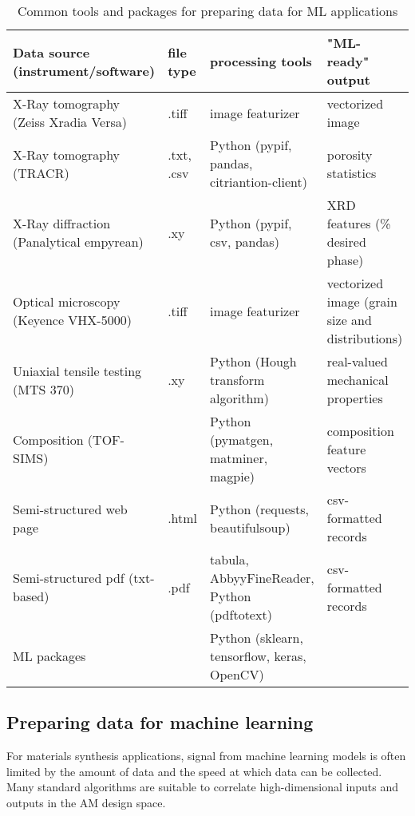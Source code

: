 \begin{table*}
    \renewcommand{\arraystretch}{0.8}
    \setlength{\tabcolsep}{5pt}
    \begin{center}
        \begin{tabular}{@{}llll@{}}
            \toprule
            Data source (instrument/software) & file type & processing tools & "ML-ready" output \\ \midrule
            \hline
            \hline
            X-Ray tomography (Zeiss Xradia Versa) & .tiff & image featurizer & vectorized image \\
            X-Ray tomography (TRACR) & .txt, .csv & Python (pypif, pandas, citriantion-client) & porosity statistics \\
            X-Ray diffraction (Panalytical empyrean) & .xy & Python (pypif, csv, pandas) & XRD features (\% desired phase) \\
            Optical microscopy (Keyence VHX-5000) & .tiff & image featurizer & vectorized image (grain size and distributions) \\
            Uniaxial tensile testing (MTS 370) & .xy & Python (Hough transform algorithm) & real-valued mechanical properties \\
            Composition (TOF-SIMS) & & Python (pymatgen, matminer, magpie) & composition feature vectors \\
            Semi-structured web page & .html & Python (requests, beautifulsoup) & csv-formatted records \\
            Semi-structured pdf (txt-based) & .pdf & tabula, AbbyyFineReader, Python (pdftotext) & csv-formatted records \\
            ML packages & & Python (sklearn, tensorflow, keras, OpenCV) & \\
            \hline
            \bottomrule
        \end{tabular}
        \caption{Common tools and packages for preparing data for ML applications}
        \label{table:data_tools}
    \end{center}
\end{table*}


\subsection{Preparing data for machine learning}

For materials synthesis applications, signal from machine learning models is often limited by the amount of data and the speed at which data can be collected.
Many standard algorithms are suitable to correlate high-dimensional inputs and outputs in the AM design space.

